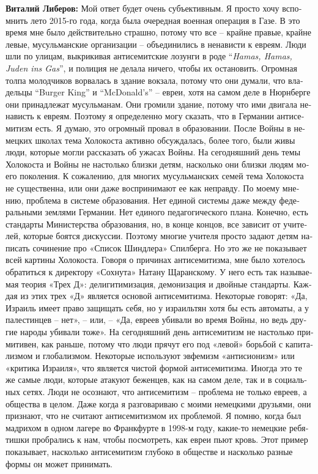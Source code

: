 \begin{otherlanguage}{russian}
	\textbf{Виталий Либеров:} Мой ответ будет очень субъективным. Я просто хочу вспомнить лето 2015-го года, когда была очередная военная операция в Газе. В это время мне было действительно страшно, потому что все – крайне правые, крайне левые, мусульманские организации – объединились в ненависти к евреям. Люди шли по улицам, выкрикивая антисемитские лозунги в роде ``\textit{Hamas, Hamas, Juden ins Gas}'', и полиция не делала ничего, чтобы их остановить. Огромная толпа молодчиков ворвалась в здание вокзала, потому что они думали, что владельцы ``Burger King''  и ``McDonald’s'' – евреи, хотя на самом деле в Нюрнберге они принадлежат мусульманам. Они громили здание, потому что ими двигала ненависть к евреям. Поэтому я определенно могу сказать, что в Германии антисемитизм есть. Я думаю, это огромный провал в образовании. После Войны в немецких школах тема Холокоста активно обсуждалась, более того, были живы люди, которые могли рассказать об ужасах Войны. На сегодняшний день темы Холокоста и Войны не настолько близки детям, насколько они близки людям моего поколения. К сожалению, для многих мусульманских семей тема Холокоста не существенна, или они даже воспринимают ее как неправду. По моему мнению, проблема в системе образования. Нет единой системы даже между федеральными землями Германии. Нет единого педагогического плана. Конечно, есть стандарты Министерства образования, но, в конце концов, все зависит от учителей, которые боятся дискуссии. Поэтому многие учителя просто задают детям написать сочинение про «Список Шиндлера» Спилберга. Но это же не показывает всей картины Холокоста. Говоря о причинах антисемитизма, мне было хотелось обратиться к директору «Сохнута» Натану Щаранскому. У него есть так называемая теория «Трех Д»: делигитимизация, демонизация и двойные стандарты. Каждая из этих трех «Д» является основой антисемитизма. Некоторые говорят: «Да, Израиль имеет право защищать себя, но у израильтян хотя бы есть автоматы, а у палестинцев – нет», – или, – «Да, евреев убивали во время Войны, но ведь другие народы убивали тоже». На сегодняшний день антисемитизм не настолько примитивен, как раньше, потому что люди прячут его под «левой» борьбой с капитализмом и глобализмом. Некоторые используют эвфемизм «антисионизм» или «критика Израиля», что является чистой формой антисемитизма. Иногда это те же самые люди, которые атакуют беженцев, как на самом деле, так и в социальных сетях. Люди не осознают, что антисемитизм – проблема не только евреев, а общества в целом. Даже когда я разговариваю с моими немецкими друзьями, они признают, что не считают антисемитизмом их проблемой. Я помню, когда был мадрихом в одном лагере во Франкфурте в 1998-м году, какие-то немецкие ребятишки пробрались к нам, чтобы посмотреть, как евреи пьют кровь. Этот пример показывает, насколько антисемитизм глубоко в обществе и насколько разные формы он может принимать.  
	

\end{otherlanguage}
